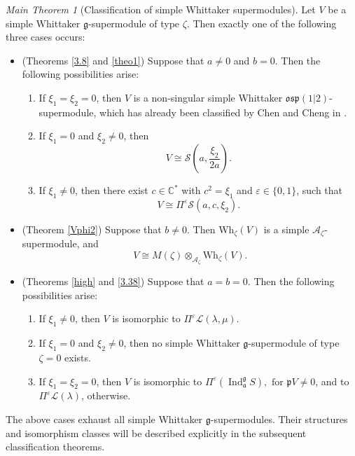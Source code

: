 \documentclass[a4paper,10pt]{article}
\theoremstyle{definition}
\theoremstyle{plain}
\theoremstyle{remark}
\theoremstyle{mystyle}
\newtheorem*{mainthm}{Main Theorem}
\numberwithin{equation}{section}
\begin{document}
\begin{mainthm}[Classification of simple Whittaker supermodules]
Let \(V\) be a simple Whittaker \(\mathfrak g\)-supermodule of type \(\zeta\). Then exactly one of the following three cases occurs:
\begin{itemize}
    \item[(1)] (Theorems \ref{3.8} and \ref{theo1}) Suppose that \(a\neq 0\) and \(b=0\). Then the following possibilities arise:
    \begin{enumerate}
        \item If \(\xi_1=\xi_2=0\), then \(V\) is a non-singular simple Whittaker \(\mathfrak{osp}(1|2)\)-supermodule, which has already been classified by Chen and Cheng in \cite[Corollary 19]{CCh24a}.
        \item If \(\xi_1=0\) and \(\xi_2\neq 0\), then
        \[
        V\cong \mathcal {S}\left(a,\frac{\xi_2}{2a}\right).
        \]
        \item If \(\xi_1\neq 0\), then there exist \(c\in\mathbb C^*\) with \(c^2=\xi_1\) and  \(\varepsilon\in\{0,1\}\), such that
       $$V\cong\Pi^\varepsilon \mathcal {S}(a,c,\xi_2).$$
    \end{enumerate}
    \item[(2)] (Theorem \ref{Vphi2}) Suppose that \(b\neq 0\). Then \(\mathrm{Wh}_{\zeta}(V)\) is a simple \(\mathcal A_{\zeta}\)-supermodule, and 
    $$V\cong M(\zeta)\otimes_{\mathcal A_{\zeta}}
    \mathrm{Wh}_{\zeta}(V).$$
    \item[(3)] (Theorems \ref{high} and \ref{3.38}) Suppose that \(a=b=0\). Then the following possibilities arise:
    \begin{enumerate}
        \item If \(\xi_1\neq 0\), then \(V\) is isomorphic to \(\Pi^{\varepsilon}\mathcal L(\lambda,\mu)\).
        \item If $\xi_1=0$ and $\xi_2\neq0$, then no simple Whittaker $\mathfrak g$-supermodule of type $\zeta=0$ exists.
        \item If \(\xi_1=\xi_2=0\), then $V$ is isomorphic to $\Pi^\varepsilon\left(\operatorname{Ind}_{\mathfrak a}^{\mathfrak g}S\right), \text{ for }\mathfrak pV\neq 0$, and to $ \Pi^{\varepsilon}\mathcal L(\lambda)$, otherwise.
        \end{enumerate}
\end{itemize}
The above cases exhaust all simple Whittaker \(\mathfrak g\)-supermodules. Their structures and isomorphism classes will be described explicitly in the subsequent classification theorems.
\end{mainthm}
\end{document}
